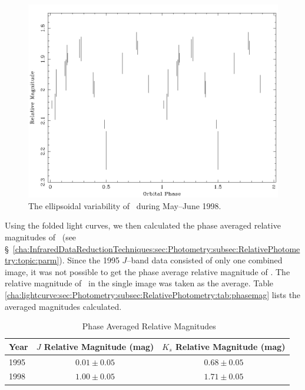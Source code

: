 \begin{figure}[!htb]
\begin{center}
\includegraphics[width=5.0in]{kctio98plot}
\caption{%
The ellipsoidal variability of \groj\ during May--June 1998. %
}
\label{cha:lightcurve:sec:Photometry:subsec:RelativePhotometry:fig:kctio98plot}
\end{center}
\end{figure}

\vspace{\myparskip}

Using the folded light curves, we then calculated the phase averaged relative magnitudes of \groj\ (see \S~\ref{cha:InfraredDataReductionTechniques:sec:Photometry:subsec:RelativePhotometry:topic:parm}). Since the 1995 $J$--band data consisted of only one combined image, it was not
possible to get the phase average relative magnitude of \groj. The
relative magnitude of \groj\ in the single image was taken as the
average. Table~%
\vref{cha:lightcurve:sec:Photometry:subsec:RelativePhotometry:tab:phasemag}
lists the averaged magnitudes calculated. 

\begin{table}[htb]
\caption{\groj\ Phase Averaged Relative Magnitudes}
\label{cha:lightcurve:sec:Photometry:subsec:RelativePhotometry:tab:phasemag}

\begin{minipage}{\linewidth}
\renewcommand{\thefootnote}{\thempfootnote}

\begin{center}
\begin{tabular}{|l||||c|c|}

\hline 
Year & $J$ Relative Magnitude (mag) & $K_s$ Relative Magnitude (mag) \\\hline\hline\hline\hline
1995 & $0.01\pm0.05$ & $0.68\pm0.05$ \\\hline 
1998 & $1.00\pm0.05$ & $1.71\pm0.05$ \\\hline 
\hline
\end{tabular}
\end{center}
\end{minipage}
\end{table}

